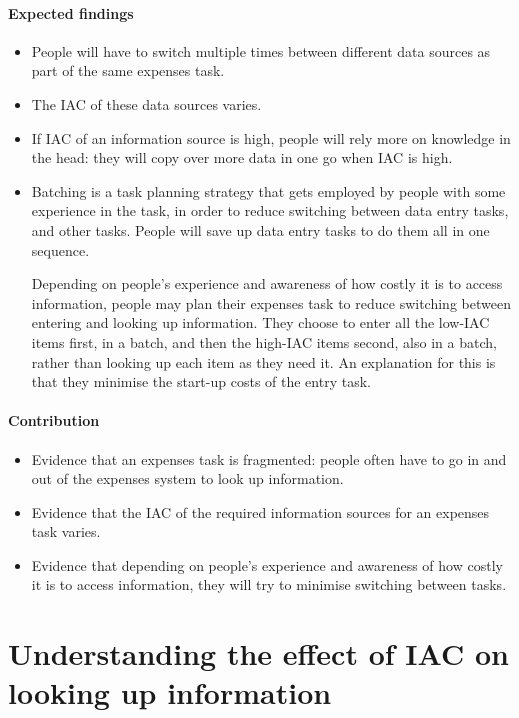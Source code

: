 \documentclass[11pt,oneside]{report}
\begin{document}
\subsubsection{Expected findings}
\begin{itemize}
\item
People will have to switch multiple times between different data sources as part of the same expenses task.
\item
The IAC of these data sources varies. 
\item
If IAC of an information source is high, people will rely more on knowledge in the head: they will copy over more data in one go when IAC is high.
\item
Batching is a task planning strategy that gets employed by people with some experience in the task, in order to reduce switching between data entry tasks, and other tasks.  People will save up data entry tasks to do them all in one sequence.

Depending on people's experience and awareness of how costly it is to access information, people may plan their expenses task to reduce switching between entering and looking up information. They choose to enter all the low-IAC items first, in a batch, and then the high-IAC items second, also in a batch, rather than looking up each item as they need it.  An explanation for this is that they minimise the start-up costs of the entry task.

\end{itemize}
\subsubsection{Contribution}
\begin{itemize}
\item
Evidence that an expenses task is fragmented: people often have to go in and out of the expenses system to look up information.    
\item
Evidence that the IAC of the required information sources for an expenses task varies. 
\item
Evidence that depending on people's experience and awareness of how costly it is to access information, they will try to minimise switching between tasks.
\end{itemize}

\chapter{Understanding the effect of IAC on looking up information}
\end{document}
